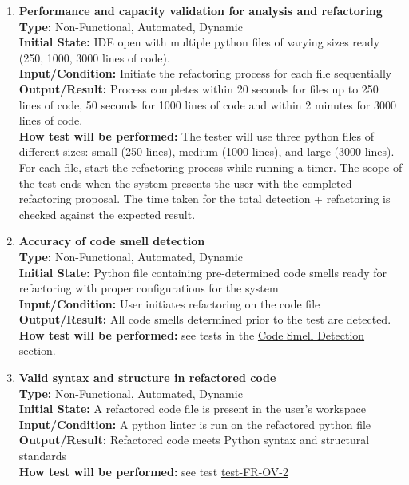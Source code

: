 \documentclass[12pt, titlepage]{article}
\begin{document}
  \begin{enumerate}[label={\bf \textcolor{Maroon}{test-PF-\arabic*}},
      wide=0pt, font=\itshape]
    \item \textbf{Performance and capacity validation for analysis
      and refactoring} \\[2mm]
      \textbf{Type:} Non-Functional, Automated, Dynamic \\
      \textbf{Initial State:} IDE open with multiple python files of
      varying sizes ready (250, 1000, 3000 lines of code). \\
      \textbf{Input/Condition:} Initiate the refactoring process for
      each file sequentially \\
      \textbf{Output/Result:} Process completes within 20 seconds for
      files up to 250 lines of code, 50 seconds for 1000 lines of
      code and within 2 minutes for 3000 lines of code. \\[2mm]
      \textbf{How test will be performed:} The tester will use three
      python files of different sizes: small (250 lines), medium
      (1000 lines), and
      large (3000 lines). For each file, start the refactoring
      process while running a timer.
      The scope of the test ends when the system presents the user
      with the completed refactoring proposal.
      The time taken for the total detection + refactoring is checked
      against the expected result.

    \item \textbf{Accuracy of code smell detection} \\[2mm]
      \textbf{Type:} Non-Functional, Automated, Dynamic \\
      \textbf{Initial State:} Python file containing pre-determined
      code smells ready for refactoring with proper configurations
      for the system \\
      \textbf{Input/Condition:} User initiates refactoring on the code file \\
      \textbf{Output/Result:} All code smells determined prior to the
      test are detected. \\[2mm]
      \textbf{How test will be performed:} see tests in the
      \hyperref[4.1.2]{Code Smell Detection} section.

    \item \textbf{Valid syntax and structure in refactored code} \\[2mm]
      \textbf{Type:} Non-Functional, Automated, Dynamic \\
      \textbf{Initial State:} A refactored code file is present in
      the user's workspace \\
      \textbf{Input/Condition:} A python linter is run on the
      refactored python file \\
      \textbf{Output/Result:} Refactored code meets Python syntax and
      structural standards \\[2mm]
      \textbf{How test will be performed:} see test
      \hyperref[itm:FR-OV-2]{test-FR-OV-2}

  \end{enumerate}
\end{document}
